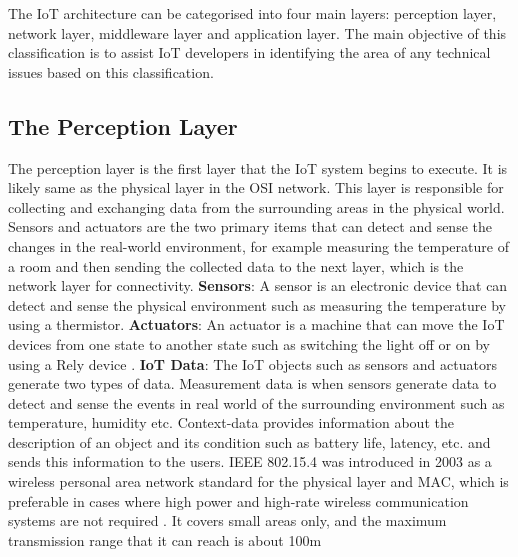\documentclass[pmlr,twocolumn,10pt]{jmlr} %
\begin{document}
 The IoT architecture can be categorised into four main 
layers: perception layer, network layer, middleware layer 
and application layer.  The main 
objective of this classification is to assist IoT developers in 
identifying the area of any technical issues based on this 
classification. 

\subsection{The Perception Layer }
The perception layer is the first layer that the IoT system 
begins to execute. It is likely same as the physical layer in 
the OSI network. This layer is responsible for collecting and 
exchanging data from the surrounding areas in the physical 
world. Sensors and actuators are the two primary items 
that can detect and sense the changes in the real-world 
environment, for example measuring the temperature of a 
room and then sending the collected data to the next layer, 
which is the network layer for connectivity. 
\textbf{Sensors}: A sensor is an electronic device that can detect and 
sense the physical environment such as measuring the 
temperature by using a thermistor.
\textbf{Actuators}: An actuator is a machine that can move the IoT 
devices from one state to another state such as switching the 
light off or on by using a Rely device . 
 \textbf{IoT Data}: The IoT objects such as sensors and actuators 
generate two types of data. Measurement data is when 
sensors generate data to detect and sense the events in real 
world of the surrounding environment such as temperature, 
humidity etc. Context-data provides information about the 
description of an object and its condition such as battery life, latency, etc. and sends this information to the users. 
 IEEE 802.15.4 was introduced in 2003 as a wireless 
personal area network standard for the physical layer and 
MAC, which is preferable in cases where high power and 
high-rate wireless communication systems are not required 
. It covers small areas only, and the maximum 
transmission range that it can reach is about 100m
\end{document}
